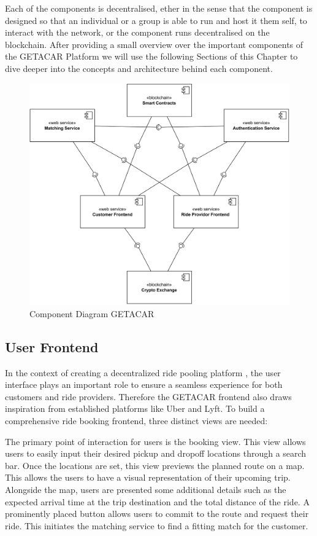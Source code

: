 Each of the components is decentralised, ether in the sense that the component is designed so that an individual or a group is able to run and host it them self, to interact with the network, or the component runs decentralised on the blockchain. After providing a small overview over the important components of the GETACAR Platform we will use the following Sections of this Chapter to dive deeper into the concepts and architecture behind each component. 

\begin{figure}[h]
    \centering
    \includegraphics[width=\linewidth]{data/10.svg}
    \caption{Component Diagram GETACAR}
    \label{fig:directSVG}
\end{figure}

\subsection{User Frontend}\label{subsec:UserFrontend}
In the context of creating a decentralized ride pooling platform , the user interface plays an important role to ensure a seamless experience for both customers and ride providers. Therefore the GETACAR frontend also draws inspiration from established platforms like Uber and Lyft. To build a comprehensive ride booking frontend, three distinct views are needed:

The primary point of interaction for users is the booking view. This view allows users to easily input their desired pickup and dropoff locations through a search bar. Once the locations are set, this view previews the planned route on a map. This allows the users to have a visual representation of their upcoming trip. Alongside the map, users are presented some additional details such as the expected arrival time at the trip destination and the total distance of the ride. A prominently placed button allows users to commit to the route and request their ride. This initiates the matching service to find a fitting match for the customer.

